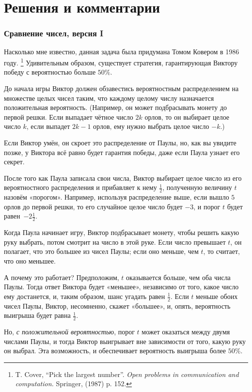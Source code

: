 \section*{Решения и комментарии}

\subsubsection*{Сравнение чисел, версия I}%

Насколько мне известно, данная задача была придумана Томом Ковером %
в 1986 году.%
\footnote{T. Cover, ``Pick the largest number''. \emph{Open problems in communication and computation.} Springer, (1987) p. 152.}
Удивительным образом, существует стратегия, гарантирующая Виктору победу с вероятностью больше $50\%$.

\medskip

До начала игры Виктор должен обзавестись вероятностным распределением на множестве целых чисел таким, что каждому целому числу назначается положительная вероятность.
(Например, он может подбрасывать монету до первой решки.
Если выпадает чётное число $2k$ орлов, то он выбирает целое число $k$, если выпадет $2k-1$ орлов, ему нужно выбрать целое число $-k$.)

Если Виктор умён, он скроет это распределение от Паулы, но, как вы увидите позже, у Виктора всё равно будет гарантия победы, даже если Паула узнает его секрет.

После того как Паула записала свои числа, Виктор выбирает целое число из его вероятностного распределения и прибавляет к нему $\tfrac12$, полученную величину  $t$ назовём «порогом».
Например, используя распределение выше, если вышло $5$ орлов до первой решки, то его случайное целое число будет $-3$, и порог $t$ будет равен~$-2 \tfrac12$.

Когда Паула начинает игру, Виктор подбрасывает монету, чтобы решить какую руку выбрать, потом смотрит на число в этой руке.
Если число превышает $t$, он полагает, что это большее из чисел Паулы; если оно меньше, чем $t$, то считает, что оно меньшее.

А почему это работает? 
Предположим, $t$ оказывается больше, чем оба числа Паулы.
Тогда ответ Виктора будет «меньшее», независимо от того, какое число ему достанется, и, таким образом, шанс угадать равен $\tfrac12$.
Если $t$ меньше обоих чисел Паулы, Виктор, несомненно, скажет «большее», и, опять, вероятность выигрыша будет равна $\tfrac12$.

Но, \emph{с положительной вероятностью}, порог $t$ может оказаться между двумя числами Паулы, и тогда Виктор выигрывает вне зависимости от того, какую руку он выбрал.
Эта возможность, и обеспечивает вероятность выигрыша более $50\%$.\heart


